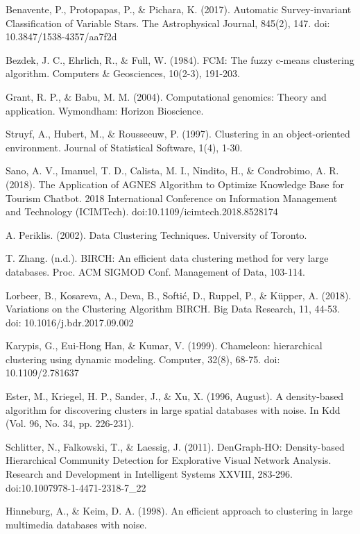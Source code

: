 \documentclass[10pt, a4paper]{article}
\begin{document}
\begin{thebibliography}{X}
 Benavente, P., Protopapas, P., \& Pichara, K. (2017). Automatic Survey-invariant Classification of Variable Stars. The Astrophysical Journal, 845(2), 147. doi: 10.3847/1538-4357/aa7f2d

 Bezdek, J. C., Ehrlich, R., \& Full, W. (1984). FCM: The fuzzy c-means clustering algorithm. Computers \& Geosciences, 10(2-3), 191-203.

 Grant, R. P., \& Babu, M. M. (2004). Computational genomics: Theory and application. Wymondham: Horizon Bioscience.

 Struyf, A., Hubert, M., \& Rousseeuw, P. (1997). Clustering in an object-oriented environment. Journal of Statistical Software, 1(4), 1-30.

 Sano, A. V., Imanuel, T. D., Calista, M. I., Nindito, H., \& Condrobimo, A. R. (2018). The Application of AGNES Algorithm to Optimize Knowledge Base for Tourism Chatbot. 2018 International Conference on Information Management and Technology (ICIMTech). doi:10.1109/icimtech.2018.8528174

 A. Periklis. (2002). Data Clustering Techniques. University of Toronto.

 T. Zhang. (n.d.). BIRCH: An efficient data clustering method for very large databases. Proc. ACM SIGMOD Conf. Management of Data, 103-114.

 Lorbeer, B., Kosareva, A., Deva, B., Softić, D., Ruppel, P., \& Küpper, A. (2018). Variations on the Clustering Algorithm BIRCH. Big Data Research, 11, 44-53. doi: 10.1016/j.bdr.2017.09.002

 Karypis, G., Eui-Hong Han, \& Kumar, V. (1999). Chameleon: hierarchical clustering using dynamic modeling. Computer, 32(8), 68-75. doi: 10.1109/2.781637

 Ester, M., Kriegel, H. P., Sander, J., \& Xu, X. (1996, August). A density-based algorithm for discovering clusters in large spatial databases with noise. In Kdd (Vol. 96, No. 34, pp. 226-231).

 Schlitter, N., Falkowski, T., \& Laessig, J. (2011). DenGraph-HO: Density-based Hierarchical Community Detection for Explorative Visual Network Analysis. Research and Development in Intelligent Systems XXVIII, 283-296. doi:10.1007\/978-1-4471-2318-7\_22

 Hinneburg, A., \& Keim, D. A. (1998). An efficient approach to clustering in large multimedia databases with noise.


\end{thebibliography}
\end{document}
